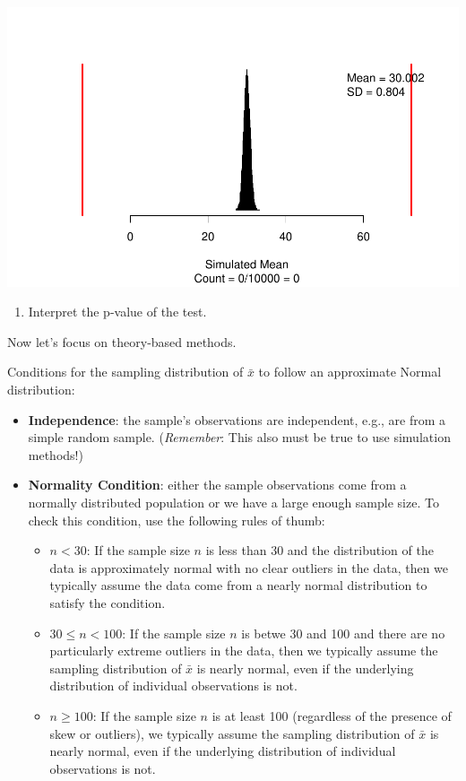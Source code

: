 \documentclass[
]{report}
\providecommand{\tightlist}{%
  \setlength{\itemsep}{0pt}\setlength{\parskip}{0pt}}
\begin{document}
\begin{center}\includegraphics[width=0.7\linewidth]{10-UR-module6_review_files/figure-latex/unnamed-chunk-3-1} \end{center}

\begin{enumerate}
\def\labelenumi{\arabic{enumi}.}
\setcounter{enumi}{7}
\tightlist
\item
  Interpret the p-value of the test.
\end{enumerate}

\vspace{1in}

\newpage

Now let's focus on theory-based methods.

Conditions for the sampling distribution of \(\bar{x}\) to follow an approximate Normal distribution:

\begin{itemize}
\item
  \textbf{Independence}: the sample's observations are independent, e.g., are from a simple random sample. (\emph{Remember}: This also must be true to use simulation methods!)
\item
  \textbf{Normality Condition}: either the sample observations come from a normally distributed population or we have a large enough sample size. To check this condition, use the following rules of thumb:

  \begin{itemize}
  \item
    \(n < 30\): If the sample size \(n\) is less than 30 and the distribution of the data is approximately normal with no clear outliers in the data, then we typically assume the data come from a nearly normal distribution to satisfy the condition.
  \item
    \(30 \leq n < 100\): If the sample size \(n\) is betwe 30 and 100 and there are no particularly extreme outliers in the data, then we typically assume the sampling distribution of \(\bar{x}\) is nearly normal, even if the underlying distribution of individual observations is not.
  \item
    \(n \geq 100\): If the sample size \(n\) is at least 100 (regardless of the presence of skew or outliers), we typically assume the sampling distribution of \(\bar{x}\) is nearly normal, even if the underlying distribution of individual observations is not.
  \end{itemize}
\end{itemize}
\end{document}

